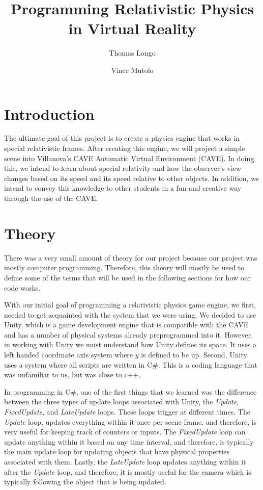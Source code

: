 \documentclass[12pt]{article}
\begin{document}
\title{Programming Relativistic Physics in Virtual Reality}
\author{Thomas Longo \and Vince Mutolo}
\maketitle

\section*{Introduction}
The ultimate goal of this project is to create a physics engine that works in special relativistic frames. After creating this engine, we will project a simple scene into Villanova's CAVE Automatic Virtual Environment (CAVE). In doing this, we intend to learn about special relativity and how the observer's view changes based on its speed and its speed relative to other objects. In addition, we intend to convey this knowledge to other students in a fun and creative way through the use of the CAVE.

\section*{Theory}
There was a very small amount of theory for our project because our project was mostly computer programming. Therefore, this theory will mostly be used to define some of the terms that will be used in the following sections for how our code works.

With our initial goal of programming a relativistic physics game engine, we first, needed to get acquainted with the system that we were using. We decided to use Unity, which is a game development engine that is compatible with the CAVE and has a number of physical systems already preprogrammed into it. However, in working with Unity we must understand how Unity defines its space. It uses a left handed coordinate axis system where $y$ is defined to be up. Second, Unity uses a system where all scripts are written in C\#. This is a coding language that was unfamiliar to us, but was close to c++. 

In programming in C\#, one of the first things that we learned was the difference between the three types of update loops associated with Unity, the \textit{Update}, \textit{FixedUpdate}, and \textit{LateUpdate} loops. These loops trigger at different times. The \textit{Update} loop, updates everything within it once per scene frame, and therefore, is very useful for keeping track of counters or inputs. The \textit{FixedUpdate} loop can update anything within it based on any time interval, and therefore, is typically the main update loop for updating objects that have physical properties associated with them. Lastly, the \textit{LateUpdate} loop updates anything within it after the \textit{Update} loop, and therefore, it is mostly useful for the camera which is typically following the object that is being updated.
\end{document}
